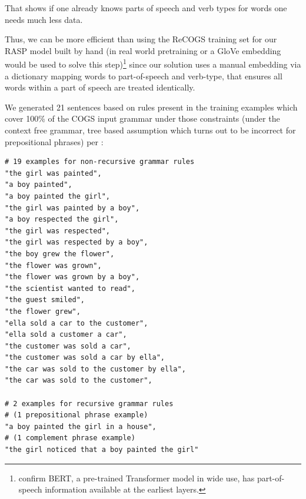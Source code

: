 \documentclass[11pt]{article}
\begin{document}
That shows if one already knows parts of speech and verb types for words one needs much less data.

Thus, we can be more efficient than using the ReCOGS training set for our RASP model built by hand (in real world pretraining or a GloVe embedding would be used to solve this step)\footnote{\cite{tenney2019bertrediscoversclassicalnlp} confirm BERT, a pre-trained Transformer model in wide use, has part-of-speech information available at the earliest layers.}
 since our solution uses a manual embedding via a dictionary mapping words to part-of-speech and verb-type, that ensures all words within a part of speech are treated identically.

We generated 21 sentences based on rules present in the training examples which cover 100\% of the COGS input grammar under those constraints (under the context free grammar, tree based assumption which turns out to be incorrect for prepositional phrases) per \cite{fuzzingbook2023:GrammarCoverageFuzzer}:

\begin{tiny}
\begin{verbatim}
# 19 examples for non-recursive grammar rules
"the girl was painted", 
"a boy painted",
"a boy painted the girl",
"the girl was painted by a boy",
"a boy respected the girl", 
"the girl was respected",
"the girl was respected by a boy",
"the boy grew the flower",
"the flower was grown",
"the flower was grown by a boy",
"the scientist wanted to read",
"the guest smiled",
"the flower grew",
"ella sold a car to the customer",
"ella sold a customer a car",
"the customer was sold a car",
"the customer was sold a car by ella",
"the car was sold to the customer by ella",
"the car was sold to the customer",

# 2 examples for recursive grammar rules
# (1 prepositional phrase example)
"a boy painted the girl in a house",
# (1 complement phrase example)
"the girl noticed that a boy painted the girl"
\end{verbatim}
\end{tiny}
\end{document}
